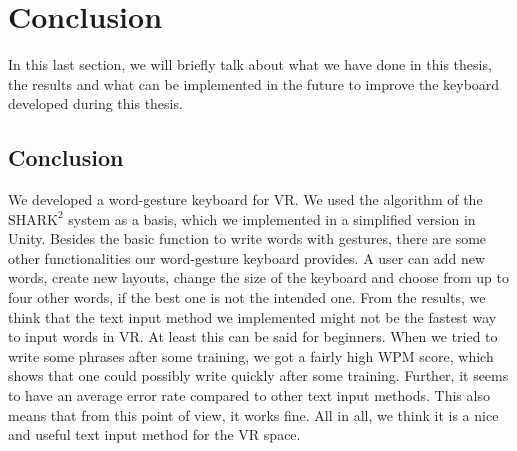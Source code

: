 \chapter{Conclusion}

In this last section, we will briefly talk about what we have done in this thesis, the results and what can be implemented in the future to improve the keyboard developed during this thesis.

\section{Conclusion}
We developed a word-gesture keyboard for VR. We used the algorithm of the $\text{SHARK}^2$ system \cite{Kristensson2004SHARK2AL} as a basis, which we implemented in a simplified version in Unity. Besides the basic function to write words with gestures, there are some other functionalities our word-gesture keyboard provides. A user can add new words, create new layouts, change the size of the keyboard and choose from up to four other words, if the best one is not the intended one. From the results, we think that the text input method we implemented might not be the fastest way to input words in VR. At least this can be said for beginners. When we tried to write some phrases after some training, we got a fairly high WPM score, which shows that one could possibly write quickly after some training. Further, it seems to have an average error rate compared to other text input methods. This also means that from this point of view, it works fine. All in all, we think it is a nice and useful text input method for the VR space.

